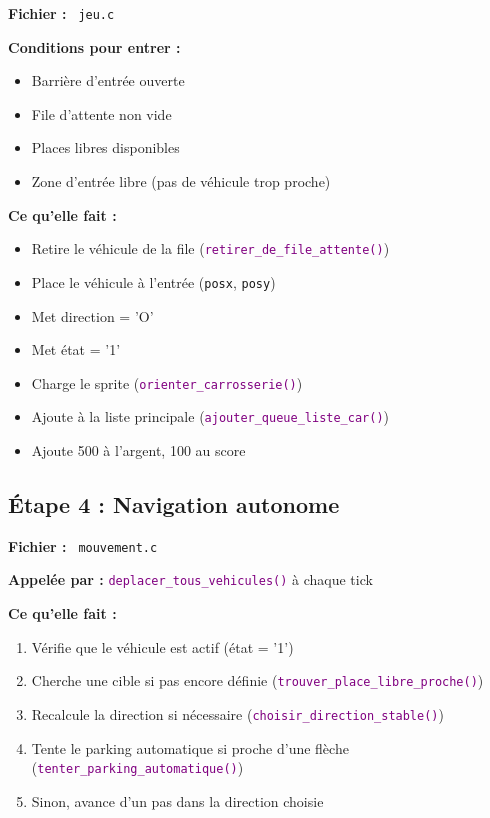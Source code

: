 \documentclass[11pt,a4paper]{article}
\newcommand{\fichier}[1]{\texttt{\textcolor{primary}{\faIcon{file-code} #1}}}
\newcommand{\fonction}[1]{\texttt{\textcolor{purple}{#1()}}}
\newcommand{\variable}[1]{\texttt{\textcolor{success}{#1}}}
\begin{document}
\begin{funcbox}
\textbf{Fichier :} \fichier{jeu.c}

\textbf{Conditions pour entrer :}
\begin{itemize}[noitemsep]
    \item Barrière d'entrée ouverte
    \item File d'attente non vide
    \item Places libres disponibles
    \item Zone d'entrée libre (pas de véhicule trop proche)
\end{itemize}

\textbf{Ce qu'elle fait :}
\begin{itemize}[noitemsep]
    \item Retire le véhicule de la file (\fonction{retirer\_de\_file\_attente})
    \item Place le véhicule à l'entrée (\variable{posx}, \variable{posy})
    \item Met direction = 'O'
    \item Met état = '1'
    \item Charge le sprite (\fonction{orienter\_carrosserie})
    \item Ajoute à la liste principale (\fonction{ajouter\_queue\_liste\_car})
    \item Ajoute 500 à l'argent, 100 au score
\end{itemize}
\end{funcbox}

\subsection{Étape 4 : Navigation autonome}

\begin{funcbox}
\textbf{Fichier :} \fichier{mouvement.c}

\textbf{Appelée par :} \fonction{deplacer\_tous\_vehicules} à chaque tick

\textbf{Ce qu'elle fait :}
\begin{enumerate}[noitemsep]
    \item Vérifie que le véhicule est actif (état = '1')
    \item Cherche une cible si pas encore définie (\fonction{trouver\_place\_libre\_proche})
    \item Recalcule la direction si nécessaire (\fonction{choisir\_direction\_stable})
    \item Tente le parking automatique si proche d'une flèche (\fonction{tenter\_parking\_automatique})
    \item Sinon, avance d'un pas dans la direction choisie
\end{enumerate}
\end{funcbox}
\end{document}

